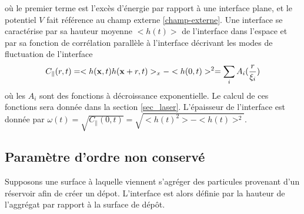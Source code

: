 où le premier terme est l'excès d'énergie par rapport à une interface plane, et le potentiel $V$ fait référence au champ externe \ref{champ-externe}. 
Une interface se caractérise par sa hauteur moyenne $<h(t)>$ de l'interface dans l'espace et par sa fonction de corrélation parallèle à l'interface décrivant les modes de fluctuation de l'interface
\begin{align}
    C_\parallel(r,t) = <h({\bf x},t)h({\bf x}+r,t)>_x - <h(0,t)>^2 = \sum_i A_i(\frac{r}{\xi_i}) 
\end{align}
où les $A_i$ sont des fonctions à décroissance exponentielle. Le calcul de ces fonctions sera donnée dans la section \ref{sec_laser}. 
L'épaisseur de l'interface est donnée par $\omega(t) = \sqrt{C_\parallel(0,t)} = \sqrt{<h(t)^2> - <h(t)>^2}$. 

    \subsection{Paramètre d'ordre non conservé}

Supposons une surface à laquelle viennent s'agréger des particules provenant d'un réservoir afin de créer un dépot. L'interface est alors définie par la hauteur de l'aggrégat par rapport à la surface de dépôt.

